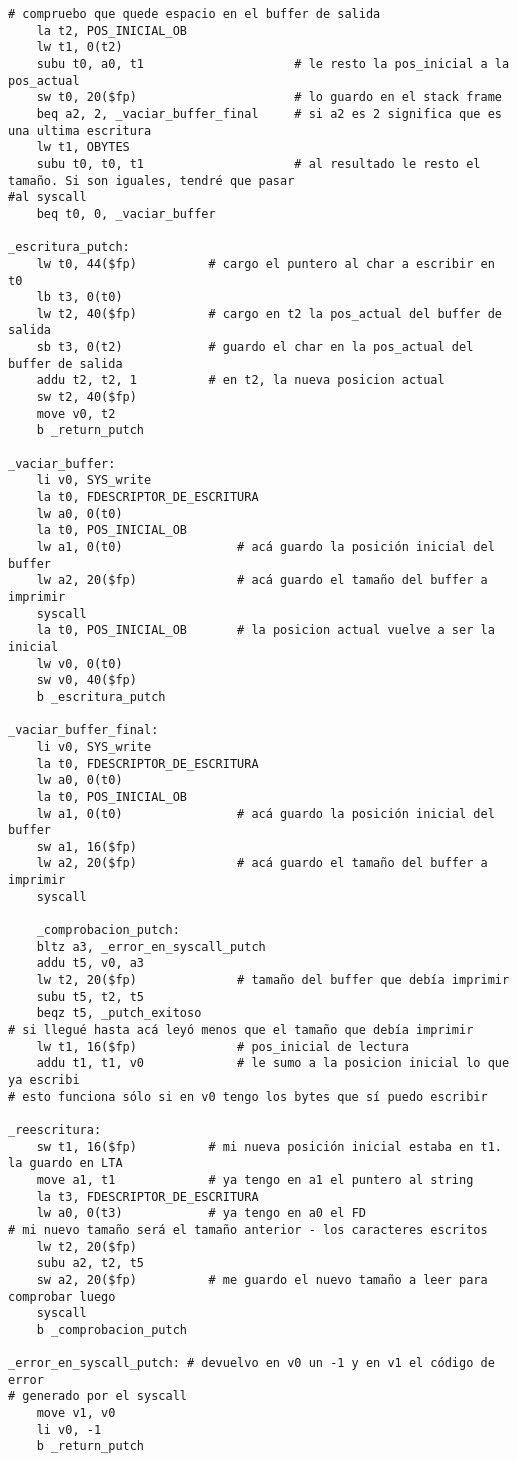 \documentclass[a4paper,10pt]{article}
\begin{document}
\begin{itemize}
\begin{verbatim}
# compruebo que quede espacio en el buffer de salida
	la t2, POS_INICIAL_OB
	lw t1, 0(t2)
	subu t0, a0, t1						# le resto la pos_inicial a la pos_actual
	sw t0, 20($fp)						# lo guardo en el stack frame
	beq a2, 2, _vaciar_buffer_final		# si a2 es 2 significa que es una ultima escritura
	lw t1, OBYTES
	subu t0, t0, t1						# al resultado le resto el tamaño. Si son iguales, tendré que pasar
#al syscall
	beq t0, 0, _vaciar_buffer 

_escritura_putch:
	lw t0, 44($fp)			# cargo el puntero al char a escribir en t0
	lb t3, 0(t0)
	lw t2, 40($fp)			# cargo en t2 la pos_actual del buffer de salida
	sb t3, 0(t2)			# guardo el char en la pos_actual del buffer de salida
	addu t2, t2, 1			# en t2, la nueva posicion actual
	sw t2, 40($fp)
	move v0, t2
	b _return_putch

_vaciar_buffer:
	li v0, SYS_write
	la t0, FDESCRIPTOR_DE_ESCRITURA
	lw a0, 0(t0)
	la t0, POS_INICIAL_OB
	lw a1, 0(t0)				# acá guardo la posición inicial del buffer
	lw a2, 20($fp)				# acá guardo el tamaño del buffer a imprimir
	syscall
	la t0, POS_INICIAL_OB		# la posicion actual vuelve a ser la inicial
	lw v0, 0(t0)
	sw v0, 40($fp)
	b _escritura_putch

_vaciar_buffer_final:
	li v0, SYS_write
	la t0, FDESCRIPTOR_DE_ESCRITURA
	lw a0, 0(t0)
	la t0, POS_INICIAL_OB
	lw a1, 0(t0)				# acá guardo la posición inicial del buffer
	sw a1, 16($fp)
	lw a2, 20($fp)				# acá guardo el tamaño del buffer a imprimir
	syscall

	_comprobacion_putch:	
	bltz a3, _error_en_syscall_putch
	addu t5, v0, a3		
	lw t2, 20($fp)				# tamaño del buffer que debía imprimir					
	subu t5, t2, t5
	beqz t5, _putch_exitoso
# si llegué hasta acá leyó menos que el tamaño que debía imprimir
	lw t1, 16($fp)				# pos_inicial de lectura
	addu t1, t1, v0				# le sumo a la posicion inicial lo que ya escribi
# esto funciona sólo si en v0 tengo los bytes que sí puedo escribir

_reescritura:
	sw t1, 16($fp)			# mi nueva posición inicial estaba en t1. la guardo en LTA
	move a1, t1 			# ya tengo en a1 el puntero al string
	la t3, FDESCRIPTOR_DE_ESCRITURA
	lw a0, 0(t3)			# ya tengo en a0 el FD
# mi nuevo tamaño será el tamaño anterior - los caracteres escritos
	lw t2, 20($fp)
	subu a2, t2, t5
	sw a2, 20($fp)			# me guardo el nuevo tamaño a leer para comprobar luego
	syscall
	b _comprobacion_putch

_error_en_syscall_putch: # devuelvo en v0 un -1 y en v1 el código de error
# generado por el syscall
	move v1, v0
	li v0, -1
	b _return_putch


\end{verbatim}
\end{itemize}
\end{document}
